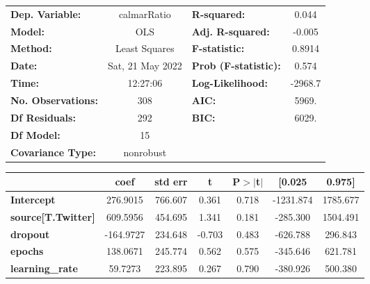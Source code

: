 \begin{center}
\begin{tabular}{lclc}
\toprule
\textbf{Dep. Variable:}              &   calmarRatio    & \textbf{  R-squared:         } &     0.044   \\
\textbf{Model:}                      &       OLS        & \textbf{  Adj. R-squared:    } &    -0.005   \\
\textbf{Method:}                     &  Least Squares   & \textbf{  F-statistic:       } &    0.8914   \\
\textbf{Date:}                       & Sat, 21 May 2022 & \textbf{  Prob (F-statistic):} &    0.574    \\
\textbf{Time:}                       &     12:27:06     & \textbf{  Log-Likelihood:    } &   -2968.7   \\
\textbf{No. Observations:}           &         308      & \textbf{  AIC:               } &     5969.   \\
\textbf{Df Residuals:}               &         292      & \textbf{  BIC:               } &     6029.   \\
\textbf{Df Model:}                   &          15      & \textbf{                     } &             \\
\textbf{Covariance Type:}            &    nonrobust     & \textbf{                     } &             \\
\bottomrule
\end{tabular}
\begin{tabular}{lcccccc}
                                     & \textbf{coef} & \textbf{std err} & \textbf{t} & \textbf{P$> |$t$|$} & \textbf{[0.025} & \textbf{0.975]}  \\
\midrule
\textbf{Intercept}                   &     276.9015  &      766.607     &     0.361  &         0.718        &    -1231.874    &     1785.677     \\
\textbf{source[T.Twitter]}           &     609.5956  &      454.695     &     1.341  &         0.181        &     -285.300    &     1504.491     \\
\textbf{dropout}                     &    -164.9727  &      234.648     &    -0.703  &         0.483        &     -626.788    &      296.843     \\
\textbf{epochs}                      &     138.0671  &      245.774     &     0.562  &         0.575        &     -345.646    &      621.781     \\
\textbf{learning\_rate}              &      59.7273  &      223.895     &     0.267  &         0.790        &     -380.926    &      500.380     \\

\end{tabular}
\end{center}
